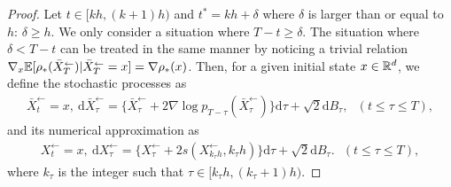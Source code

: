 \begin{proof}
Let $t \in [kh,(k+1)h)$ and $t^* = kh + \delta$ where $\delta$ is larger than or equal to $h$: $\delta \geq h$. 
We only consider a situation where $T- t \geq \delta$. 
The situation where $\delta < T- t$ can be treated in the same manner by noticing 
a trivial relation $\nabla_x \mathbb{E}[\rho_*(\bar{X}_{T}^\leftarrow) | \bar{X}_{T}^\leftarrow = x]
= \nabla \rho_*(x)$.
Then, for a given initial state $x \in {\mathbb{R}}^d$, we define the stochastic processes as 
\begin{align}
    \bar{X}_{t}^\leftarrow=x,\ \mathrm{d}\bar{X}_{\tau}^\leftarrow = \{\bar{X}_{\tau}^\leftarrow + 2\nabla \log p_{T-\tau}(\bar{X}_{\tau}^\leftarrow)\}\mathrm{d}\tau + \sqrt{2}\mathrm{d}B_\tau,
    ~~~(t \leq \tau \leq T), 
\end{align}
and its numerical approximation as  
\begin{align}
    {X}_{t}^\leftarrow=x,\ \mathrm{d}{X}_{\tau}^\leftarrow = \{{X}_{\tau}^\leftarrow + 2s({X}^\leftarrow_{k_\tau h},k_\tau h)\}\mathrm{d}\tau + \sqrt{2}\mathrm{d}B_\tau.
    ~~~(t \leq \tau \leq T), 
\end{align}
where $k_\tau$ is the integer such that $\tau \in [k_\tau h,(k_\tau +1)h)$. 


\end{proof}
